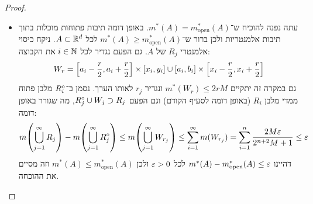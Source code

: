 \documentclass[]{../../../../tex/classes/homework}
\newcommand\mo {m^*_{\mathrm{open}}}
\newcommand\mc {m^*_{\mathrm{closed}}}
\begin{document}
\begin{proof}
\begin{itemize}
			יהי כיסוי \textbf{אלמנטרי} $R_j$ של $A$. לכל מלבן אלמנטרי $[a_i, b_i) \times [x_i, y_i)$ נבחין שהקבוצה: 
			\[ E_{r} = \csb{b_i - \frac{r}{2}, b_i + \frac{r}{2}} \times [x_i, y_i] \cup \csb{a_i, b_i} \times \csb{y_i - \frac{r}{2}, y_i + \frac{r}{2}} \]
			מקיימת מתת־אדטיביות ומחסימות ע''י $M$: 
			\[ m^*(E_r) = m(E_r) \le r \cdot (y_i - x_i) + r \cdot (b_i - a_i) \le 2rM \]
			עוד נבחין ש־: 
			\[ R_i = [a_i, b_i) \times [x_i, y_i) \cup E_r \subset [a_i, b_i] \times [x_i, y_i] \doc \ol{R_i} \]
			כאשר $\ol{R_i}$ מלבן סגור. לכל $r > 0$. דהיינו: 
			\[ A = \bigcup_{j = 1}^{\infty}R_j \subset \bigcup_{i = 1}^{\infty}R_j \cup E_{r_j} \subset \bigcup_{i = 1}^{\infty}\ol{R_j} \]
			כאשר $r_j  = \frac{\eg}{2^{n + 2} \cdot M + 1} \ge 0$. מתת־אדטיביות: 
			\[ m\!\cl{\bigcup_{j = 1}^{\infty} \ol{R_j}} \le m\!\cl{\bigcup_{j = 1}^{\infty} R_j} + m\!\cl{\bigcup_{j = 1}^{\infty} E_{r_j}} \]
			ומתת־\ס־אדטיביות: 
			\[ m\!\cl{\bigcup_{j = 1}^{\infty} \ol{R_j}} - m\!\cl{\bigcup_{j = 1}^{\infty} R_j} \le m\!\cl{\bigcup_{j = 1}^{\infty} E_{r_j}} \le \sum_{i = 1}^{\infty}m(E_{r_j}) = \sum_{i = 1}^{n}\frac{2M\eg}{2^{n + 2}M + 1} \le \eg \]
			משום ש־$\inf$ אינווריאנטי להוספה של קבוע $\eg$, סה''כ $m^*(A) + \eg \ge \mc(A)$ לכל $\eg > 0$. נסיק ש־$m^*(A) \ge \mc(A)$ כנדרש. 
			\item עתה נפנה להוכיח ש־$m^*(A) = \mo(A)$. באופן דומה תיבות פתוחות מוכלות בתוך תיבות אלמנטריות ולכן ברור ש־$m^*(A) \ge \mo(A)$ לכל $A \subset \mathbb{R}^{d}$. ניקח כיסוי אלמנטרי $R_j$ של $A$. גם הפעם נגדיר לכל $i \in \mathbb{N}$ את הקבוצה: 
			\[ W_{r} = \left [ a_i - \frac{r}{2}, a_i + \frac{r}{2} \right ] \times [x_i, y_i] \cup \left [ a_i, b_i \right ] \times \left [ x_i - \frac{r}{2}, x_i + \frac{r}{2} \right ] \]
			גם במקרה זה יתקיים $m^*(W_r) \le 2rM$ ונגדיר $r_j$ לאותו הערך. נסמן ב־$R_i^{\circ}$ מלבן פתוח ממדי מלבן $R_i$ (באופן דומה לסעיף הקודם) וגם הפעם $R_j^{\circ} \cup W_j \supset R_j$, מה שגורר באופן דומה:
			\[ m\!\cl{\bigcup_{j = 1}^{\infty} R_j} - m\!\cl{\bigcup_{j = 1}^{\infty} R_j\intr} \le m\!\cl{\bigcup_{j = 1}^{\infty} W_{r_j}} \le \sum_{i = 1}^{\infty}m(W_{r_j}) = \sum_{i = 1}^{n}\frac{2M\eg}{2^{n + 2}M + 1} \le \eg \]
			דהיינו $m^*(A) - \mo(A) \le \eg$ לכל $\eg > 0$ ולכן $m^*(A) \le \mo(A)$ וזה מסיים את ההוכחה. 
		\end{itemize}
	\end{proof}
	
\end{document}
